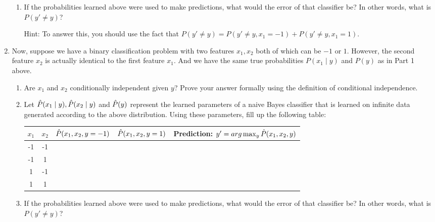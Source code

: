 \begin{enumerate}
\begin{enumerate}
  \item \relax[3 points] If the probabilities learned above were used to
    make predictions, what would the error of that classifier be? In
    other words, what is $P(y' \ne y)$? 

    Hint: To answer this, you should use the fact that
    $P(y' \ne y) = P(y' \ne y, x_1 = -1) + P(y' \ne y, x_1 = 1)$.

  \end{enumerate}

\item \relax[Part 2] Now, suppose we have a binary classification
  problem with two features $x_1, x_2$ both of which can be $-1$ or
  $1$. However, the second feature $x_2$ is actually identical to the
  first feature $x_1$. And we have the same true probabilities
  $P(x_1 \mid y)$ and $P(y)$ as in Part 1 above.

  \begin{enumerate}
  \item \relax[1 point] Are $x_1$ and $x_2$ conditionally independent
    given $y$? Prove your answer formally using the definition of
    conditional independence.
  \item \relax[8 points] Let $\hat{P}(x_1 \mid y), \hat{P}(x_2 \mid y)$ and
    $\hat{P}(y)$ represent the learned parameters of a naive Bayes
    classifier that is learned on infinite data generated according to
    the above distribution. Using these parameters, fill up the
    following table:


    \begin{tabular}{|c|c|c|c|c|}
      \hline
      $x_1$ & $x_2$ & $\hat{P}(x_1, x_2, y= -1)$ & $\hat{P}(x_1, x_2, y=1)$ & {\bf Prediction: $y' = arg\max_y \hat{P}(x_1, x_2, y)$} \\
      \hline
      -1    & -1    &                        &                      &                                                   \\
      -1    & 1     &                        &                      &                                                   \\
      1     & -1    &                        &                      &                                                   \\
      1     & 1     &                        &                      &                                                   \\
      \hline
    \end{tabular}

  \item \relax[3 points] If the probabilities learned above were used to
    make predictions, what would the error of that classifier be? In
    other words, what is $P(y' \ne y)$?


\end{enumerate}
\end{enumerate}
